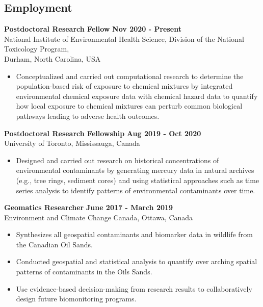 \documentclass[margin,line]{res}
\begin{document}
\begin{resume}
\vspace*{.1in}
\section{\sc Employment}

{\bf  Postdoctoral Research Fellow} \hfill {\bf Nov 2020 - Present}\\
National Institute of Environmental Health Science, Division of the National Toxicology Program,\\
Durham, North Carolina, USA
\begin{itemize}
\item Conceptualized and carried out computational research to determine the population-based risk of exposure to chemical mixtures by integrated environmental chemical exposure data with chemical hazard data to quantify how local exposure to chemical mixtures can perturb common biological pathways leading to adverse health outcomes.
\end{itemize}

{\bf Postdoctoral Research Fellowship} \hfill {\bf Aug 2019 - Oct 2020}\\
University of Toronto, Mississauga, Canada
\begin{itemize}
\item Designed and carried out research on historical concentrations of environmental contaminants by generating mercury data in natural archives (e.g., tree rings, sediment cores) and using statistical approaches such as time series analysis to identify patterns of environmental contaminants over time.
\end{itemize}

{\bf Geomatics Researcher} \hfill {\bf June 2017 - March 2019}\\
Environment and Climate Change Canada, Ottawa, Canada
\begin{itemize}
\item Synthesizes all geospatial contaminants and biomarker data in wildlife from the Canadian Oil Sands.
\item Conducted geospatial and statistical analysis to quantify over arching spatial patterns of contaminants in the Oils Sands.
\item Use evidence-based decision-making from research results to collaboratively design future biomonitoring programs.
\end{itemize}


\end{resume}
\end{document}
